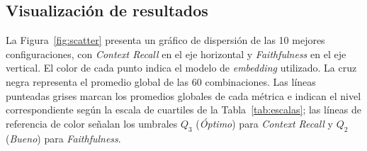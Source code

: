 \documentclass{article}
\begin{document}
\subsection{Visualización de resultados}

La Figura~\ref{fig:scatter} presenta un gráfico de dispersión de las 10 mejores configuraciones, con \textit{Context Recall} en el eje horizontal y \textit{Faithfulness} en el eje vertical. El color de cada punto indica el modelo de \textit{embedding} utilizado. La cruz negra representa el promedio global de las 60 combinaciones. Las líneas punteadas grises marcan los promedios globales de cada métrica e indican el nivel correspondiente según la escala de cuartiles de la Tabla~\ref{tab:escalas}; las líneas de referencia de color señalan los umbrales $Q_3$ (\textit{Óptimo}) para \textit{Context Recall} y $Q_2$ (\textit{Bueno}) para \textit{Faithfulness}.
\end{document}
